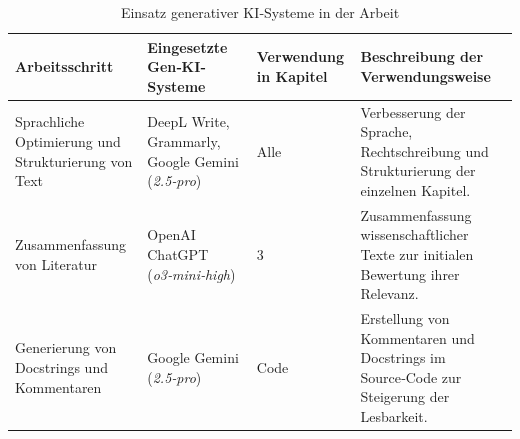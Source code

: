 \begin{table}[htbp]
  \centering
  \begin{tabularx}{\textwidth}{
    @{} 
      L{3.5cm}
      L{2.5cm}
      C{2.5cm}
      L{5cm}
    @{}}
    \toprule
    \textbf{Arbeitsschritt}
      & \textbf{Eingesetzte Gen‑KI‑ Systeme}
      & \textbf{Verwendung in Kapitel}
      & \textbf{Beschreibung der Verwendungsweise} \\
    \midrule
    Sprachliche Optimierung und Strukturierung von Text
      & DeepL Write, Grammarly, Google Gemini (\textit{2.5‑pro})
      & Alle
      & Verbesserung der Sprache, Rechtschreibung und Strukturierung der einzelnen Kapitel. \\
    Zusammenfassung von Literatur
      & OpenAI ChatGPT (\textit{o3‑mini‑high})
      & 3
      & Zusammenfassung wissenschaftlicher Texte zur initialen Bewertung ihrer Relevanz. \\
    Generierung von Docstrings und Kommentaren
      & Google Gemini (\textit{2.5‑pro})
      & Code
      & Erstellung von Kommentaren und Docstrings im Source‑Code zur Steigerung der Lesbarkeit. \\
    \bottomrule
  \end{tabularx}
  \caption{Einsatz generativer KI‐Systeme in der Arbeit}
\end{table}